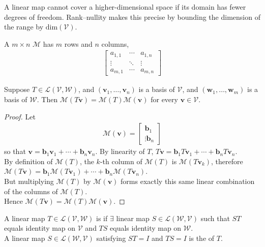 A linear map cannot cover a higher-dimensional space if its domain has fewer degrees of freedom. Rank–nullity makes this precise by bounding the dimension of the range by $\text{dim}(\mathcal{V})$.

\begin{definition} A $m \times n$  $\mathcal{M}$ has $m$ rows and $n$ columns,
\begin{align}
\begin{bmatrix}
a_{1,1} & \cdots & a_{1,n} \\
\vdots & \ddots & \vdots \\
a_{m,1} & \cdots & a_{m,n}
\end{bmatrix} \nonumber
\end{align}
\end{definition}

\begin{proposition} Suppose $T \in \mathcal{L}(\mathcal{V}, \mathcal{W})$, and $(\mathbf{v}_1, \ldots, \mathbf{v}_n)$ is a basis of $\mathcal{V}$, and $(\mathbf{w}_1, \ldots, \mathbf{w}_m)$ is a basis of $\mathcal{W}$. Then $\mathcal{M}(T\mathbf{v}) = \mathcal{M}(T)\mathcal{M}(\mathbf{v})$ for every $\mathbf{v} \in \mathcal{V}$.
\begin{proof} Let
\begin{align}
\mathcal{M}(\mathbf{v}) =
\begin{bmatrix}
\mathbf{b}_1 \\
\vdots
\mathbf{b}_n
\end{bmatrix} \nonumber
\end{align}
so that $\mathbf{v} = \mathbf{b}_1 \mathbf{v}_1 + \cdots + \mathbf{b}_n \mathbf{v}_n$. By linearity of $T$, $T\mathbf{v} = \mathbf{b}_1 T \mathbf{v}_1 +\cdots + \mathbf{b}_n T \mathbf{v}_n$.\\
By definition of $\mathcal{M}(T)$, the $k$-th column of $\mathcal{M}(T)$ is $\mathcal{M}(T \mathbf{v}_k)$, therefore $\mathcal{M}(T\mathbf{v}) = \mathbf{b}_1 \mathcal{M}(T \mathbf{v}_1) +\cdots + \mathbf{b}_n \mathcal{M}(T \mathbf{v}_n)$.\\
But multiplying $\mathcal{M}(T)$ by $\mathcal{M}(\mathbf{v})$ forms exactly this same linear combination of the columns of $\mathcal{M}(T)$.\\
Hence $\mathcal{M}(T \mathbf{v}) = \mathcal{M}(T) \mathcal{M}(\mathbf{v})$.
\end{proof}
\end{proposition}

\begin{definition} A linear map $T \in \mathcal{L}(\mathcal{V}, \mathcal{W})$ is  if $\exists$ linear map $S \in \mathcal{L}(\mathcal{W}, \mathcal{V})$ such that $ST$ equals identity map on $\mathcal{V}$ and $TS$ equals identity map on $\mathcal{W}$.\\
A linear map $S \in \mathcal{L}(\mathcal{W}, \mathcal{V})$ satisfying $ST = I$ and $TS=I$ is the  of $T$.
\end{definition}

